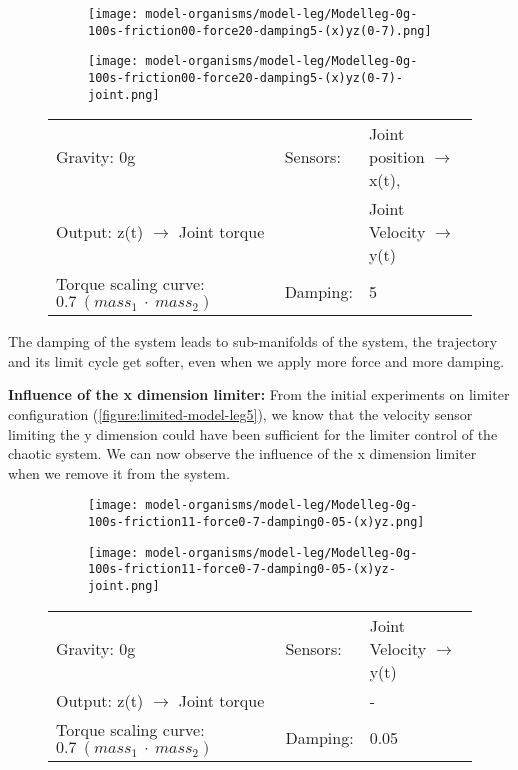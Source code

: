 \documentclass[main]{subfiles}
\begin{document}
\begin{figure}[H]
	\centering
		\begin{subfigure}[c]{0.45\textwidth}
	\texttt{[image: model-organisms/model-leg/Modelleg-0g-100s-friction00-force20-damping5-(x)yz(0-7).png]}
		\end{subfigure}
	\begin{subfigure}[c]{0.45\textwidth}
	\texttt{[image: model-organisms/model-leg/Modelleg-0g-100s-friction00-force20-damping5-(x)yz(0-7)-joint.png]}
		\end{subfigure}
	\caption[Limited chaotic controller controlling model leg]{}
	\begin{tabular}{l|ll}
	\hline 
	Gravity: 0g  & Sensors: & Joint position \(\rightarrow\) x(t),\\
	 Output: z(t) \(\rightarrow\) Joint torque &  & Joint Velocity \(\rightarrow\) y(t) \\
	  Torque scaling curve: \(0.7~(mass_1~\cdot~mass_2)\) & Damping: & 5 \\
	  \hline
	\end{tabular}

	\label{figure:limited-damped-model-leg-damping4}
\end{figure}

The damping of the system leads to sub-manifolds of the system, the trajectory and its limit cycle get softer, even when we apply more force and more damping.

\textbf{Influence of the x dimension limiter:} From the initial experiments on limiter configuration (\ref{figure:limited-model-leg5}), we know that the velocity sensor limiting the y dimension could have been sufficient for the limiter control of the chaotic system. We can now observe the influence of the x dimension limiter when we remove it from the system.

\begin{figure}[H]
	\centering
		\begin{subfigure}[c]{0.45\textwidth}
	\texttt{[image: model-organisms/model-leg/Modelleg-0g-100s-friction11-force0-7-damping0-05-(x)yz.png]}
		\end{subfigure}
	\begin{subfigure}[c]{0.45\textwidth}
	\texttt{[image: model-organisms/model-leg/Modelleg-0g-100s-friction11-force0-7-damping0-05-(x)yz-joint.png]}
		\end{subfigure}
	\caption[Limited chaotic controller controlling model leg]{}
	\begin{tabular}{l|ll}
	\hline 
	Gravity: 0g  & Sensors: & Joint Velocity \(\rightarrow\) y(t)\\
	 Output: z(t) \(\rightarrow\) Joint torque & & - \\
	  Torque scaling curve: \(0.7~(mass_1~\cdot~mass_2)\) & Damping: & 0.05 \\
	  \hline
	\end{tabular}

	\label{figure:limited-damped-model-leg4}
\end{figure}
\end{document}

